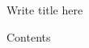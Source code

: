 \documentclass[11pt]{article}
\begin{document}
	\begin{center}
		\Large Write title here
	\end{center}
	Contents
\end{document}
